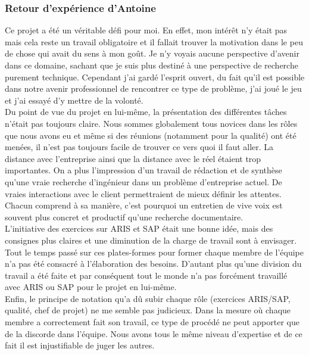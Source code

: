\subsubsection{Retour d'expérience d'Antoine}

Ce projet a été un véritable défi pour moi. En effet, mon intérêt n’y était pas mais cela reste un travail obligatoire et il fallait trouver la motivation dans le peu de chose qui avait du sens à mon goût. Je n'y voyais aucune perspective d’avenir dans ce domaine, sachant que je suis plus destiné à une perspective de recherche purement technique. Cependant j’ai gardé l’esprit ouvert, du fait qu’il est possible dans notre avenir professionnel de rencontrer ce type de problème, j’ai joué le jeu et j’ai essayé d’y mettre de la volonté. \\

Du point de vue du projet en lui-même, la présentation des différentes tâches n’était pas toujours claire. Nous sommes globalement tous novices dans les rôles que nous avons eu et même si des réunions (notamment pour la qualité) ont été menées, il n’est pas toujours facile de trouver ce vers quoi il faut aller. La distance avec l’entreprise ainsi que la distance avec le réel étaient trop importantes. On a plus l’impression d’un travail de rédaction et de synthèse qu’une vraie recherche d’ingénieur dans un problème d’entreprise actuel. De vraies interactions avec le client permettraient de mieux définir les attentes. Chacun comprend à sa manière, c’est pourquoi un entretien de vive voix est souvent plus concret et productif qu’une recherche documentaire. \\

L’initiative des exercices sur ARIS et SAP était une bonne idée, mais des consignes plus claires et une diminution de la charge de travail sont à envisager. Tout le temps passé sur ces plates-formes pour former chaque membre de l’équipe n’a pas été consacré à l’élaboration des besoins. D’autant plus qu’une division du travail a été faite et par conséquent tout le monde n’a pas forcément travaillé avec ARIS ou SAP pour le projet en lui-même. \\

Enfin, le principe de notation qu’a dû subir chaque rôle (exercices ARIS/SAP, qualité, chef de projet) ne me semble pas judicieux. Dans la mesure où chaque membre a correctement fait son travail, ce type de procédé ne peut apporter que de la discorde dans l’équipe. Nous avons tous le même niveau d’expertise et de ce fait il est injustifiable de juger les autres. \\

